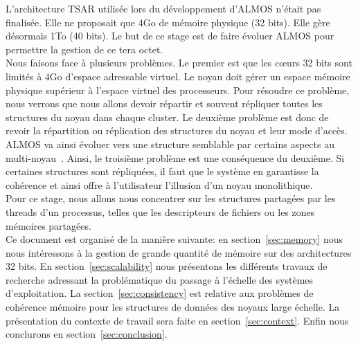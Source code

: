   \hspace{1cm}L'architecture TSAR utilisée lors du développement d'ALMOS n'était
  pas finalisée. Elle ne proposait que 4Go de mémoire physique (32 bits). Elle
  gère désormais 1To (40 bits). Le but de ce stage est de faire évoluer ALMOS
  pour permettre la gestion de ce tera octet.\\

  \hspace{1cm}Nous faisons face à plusieurs problèmes. Le premier est que les
  c\oe urs 32 bits sont limités à 4Go d'espace adressable virtuel. Le noyau doit
  gérer un espace mémoire physique supérieur à l'espace virtuel des
  processeurs. Pour résoudre ce problème, nous verrons que nous allons devoir
  répartir et souvent répliquer toutes les structures du noyau dans chaque
  cluster.  Le deuxième problème est donc de revoir la répartition ou
  réplication des structures du noyau et leur mode d'accès. ALMOS va ainsi
  évoluer vers une structure semblable par certains aspects au
  multi-noyau~\citep{baumann2009multikernel}. Ainsi, le troisième problème est
  une conséquence du deuxième. Si certaines structures sont répliquées, il faut
  que le système en garantisse la cohérence et ainsi offre à l'utilisateur
  l'illusion d'un noyau monolithique. \\

  \hspace{1cm}Pour ce stage, nous allons nous concentrer sur les structures
  partagées par les threads d'un processus, telles que les descripteurs de
  fichiers ou les zones mémoires partagées. \\

  \hspace{1cm}Ce document est organisé de la manière suivante: en
  section~\ref{sec:memory} nous nous intéressons à la gestion de grande quantité
  de mémoire sur des architectures 32 bits. En section~\ref{sec:scalability}
  nous présentons les différents travaux de recherche adressant la problématique
  du passage à l'échelle des systèmes d'exploitation.  La
  section~\ref{sec:consistency} est relative aux problèmes de cohérence mémoire
  pour les structures de données des noyaux large échelle. La présentation du
  contexte de travail sera faite en section~\ref{sec:context}. Enfin nous
  conclurons en section~\ref{sec:conclusion}.\newline
